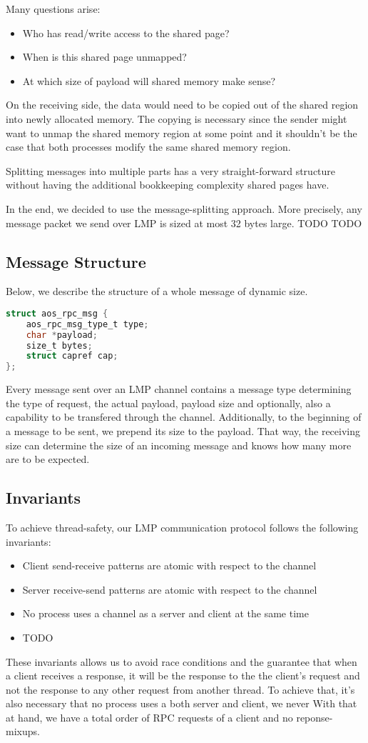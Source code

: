 Many questions arise:
\begin{itemize}
    \item Who has read/write access to the shared page? 
    \item When is this shared page unmapped?
    \item At which size of payload will shared memory make sense?
\end{itemize}
On the receiving side, the data would need to be copied out of the shared region 
into newly allocated memory. The copying is necessary since the sender 
might want to unmap the shared memory region at some point and it shouldn't be 
the case that both processes modify the same shared memory region.

Splitting messages into multiple parts has a very straight-forward structure 
without having the additional bookkeeping complexity shared pages have.


In the end, we decided to use the message-splitting approach.
More precisely, any message packet we send over LMP is sized at most 32 bytes
large.  
TODO TODO

\subsection{Message Structure}
Below, we describe the structure of a whole message of dynamic size.
\begin{lstlisting}[language=C]
struct aos_rpc_msg {
    aos_rpc_msg_type_t type;
    char *payload;
    size_t bytes;
    struct capref cap;
};
\end{lstlisting}
Every message sent over an LMP channel contains a message type determining 
the type of request, the actual payload, payload size and optionally, 
also a capability to be transfered through the channel. 
Additionally, to the beginning of a message to be sent, we prepend its size 
to the payload. That way, the receiving size can determine the size of an 
incoming message and knows how many more are to be expected.

\subsection{Invariants}
To achieve thread-safety, our LMP communication protocol 
follows the following invariants:
\begin{itemize}
    \item Client send-receive patterns are atomic with respect to the channel
    \item Server receive-send patterns are atomic with respect to the channel
    \item No process uses a channel as a server and client at the same time
    \item TODO
\end{itemize}
These invariants allows us to avoid race conditions and the guarantee that 
when a client receives a response, it will be the response to the the client's
request and not the response to any other request from another thread.
To achieve that, it's also necessary that no process uses a both server and client, we never 
With that at hand, we have a total order of RPC requests of a client and no 
reponse-mixups.

